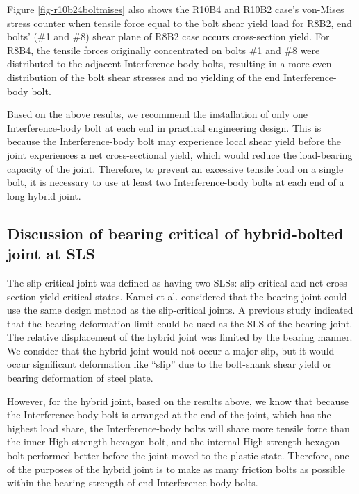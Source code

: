 Figure \ref{fig-r10b24boltmises} also shows the R10B4 and R10B2 case's von-Mises stress counter when tensile force equal to the bolt shear yield load for R8B2, end bolts' (\#1 and \#8) shear plane of R8B2 case occurs cross-section yield. For R8B4, the tensile forces originally concentrated on bolts \#1 and \#8 were distributed to the adjacent Interference-body bolts, resulting in a more even distribution of the bolt shear stresses and no yielding of the end Interference-body bolt.

Based on the above results, we recommend the installation of only one Interference-body bolt at each end in practical engineering design. This is because the Interference-body bolt may experience local shear yield before the joint experiences a net cross-sectional yield, which would reduce the load-bearing capacity of the joint. Therefore, to prevent an excessive tensile load on a single bolt, it is necessary to use at least two Interference-body bolts at each end of a long hybrid joint.


\subsection{Discussion of bearing critical of hybrid-bolted joint at SLS}

The slip-critical joint was defined as having two SLSs: slip-critical and net cross-section yield critical states. Kamei et al. \cite{kamei2010} considered that the bearing joint could use the same design method as the slip-critical joints. A previous study indicated that the bearing deformation limit could be used \cite{Rex2003,TODA2014} as the SLS of the bearing joint. The relative displacement of the hybrid joint was limited by the bearing manner. We consider that the hybrid joint would not occur a major slip, but it would occur significant deformation like ``slip'' due to the bolt-shank shear yield or bearing deformation of steel plate.

However, for the hybrid joint, based on the results above, we know that because the Interference-body bolt is arranged at the end of the joint, which has the highest load share, the Interference-body bolts will share more tensile force than the inner High-strength hexagon bolt, and the internal High-strength hexagon bolt performed better before the joint moved to the plastic state. Therefore, one of the purposes of the hybrid joint is to make as many friction bolts as possible within the bearing strength of end-Interference-body bolts.

